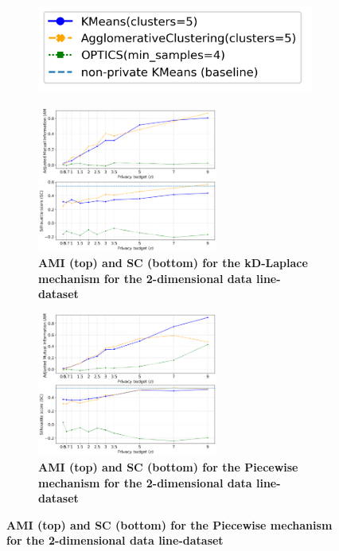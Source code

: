 \begin{figure}[H]
  \centering
  \begin{subfigure}{0.3\textwidth}
    \includegraphics[width=\textwidth]{Results/kd-laplace/kd-Laplace/circle-dataset/legend_2.png}
  \end{subfigure}
  \begin{subfigure}{1\textwidth}
    \centering
    \caption{\textbf{AMI (top) and SC (bottom) for the kD-Laplace mechanism for the 2-dimensional data line-dataset}}
    \includegraphics[width=0.65\textwidth]{Results/kd-laplace/kd-Laplace/line-dataset/ami-and-sc_2_dimensions.png}
    \centering
  \end{subfigure}
  \begin{subfigure}{1\textwidth}
    \centering
    \caption{\textbf{AMI (top) and SC (bottom) for the Piecewise mechanism for the 2-dimensional data line-dataset}}
    \includegraphics[width=0.65\textwidth]{Results/kd-laplace/piecewise/line-dataset/ami-and-sc_2_dimensions.png}
  \end{subfigure}
  \label{fig:validation-line-dataset_comparison_2d-laplace}
\end{figure}
